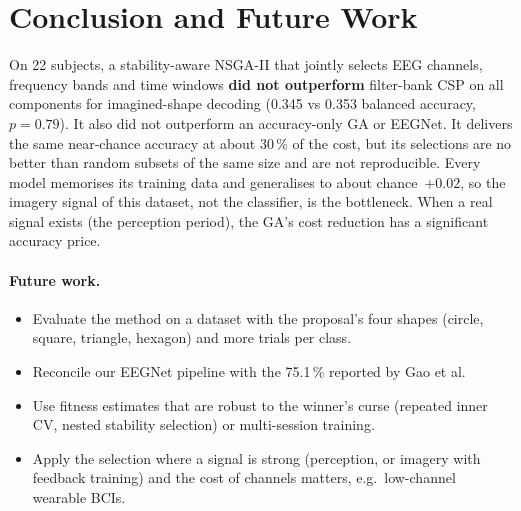 \documentclass[11pt,a4paper]{article}
\begin{document}
\section{Conclusion and Future Work}
On 22 subjects, a stability-aware NSGA-II that jointly selects EEG channels, frequency bands and time
windows \textbf{did not outperform} filter-bank CSP on all components for imagined-shape decoding (0.345
vs 0.353 balanced accuracy, $p=0.79$). It also did not outperform an accuracy-only GA or EEGNet. It
delivers the same near-chance accuracy at about 30\,\% of the cost, but its selections are no better than
random subsets of the same size and are not reproducible. Every model memorises its training data and
generalises to about chance~$+0.02$, so the imagery signal of this dataset, not the classifier, is the
bottleneck. When a real signal exists (the perception period), the GA's cost reduction has a significant
accuracy price.

\paragraph{Future work.}
\begin{itemize}
  \item Evaluate the method on a dataset with the proposal's four shapes (circle, square, triangle,
        hexagon) and more trials per class.
  \item Reconcile our EEGNet pipeline with the 75.1\,\% reported by Gao et al.
  \item Use fitness estimates that are robust to the winner's curse (repeated inner CV, nested
        stability selection) or multi-session training.
  \item Apply the selection where a signal is strong (perception, or imagery with feedback training) and
        the cost of channels matters, e.g.\ low-channel wearable BCIs.
\end{itemize}

\appendix
\end{document}
